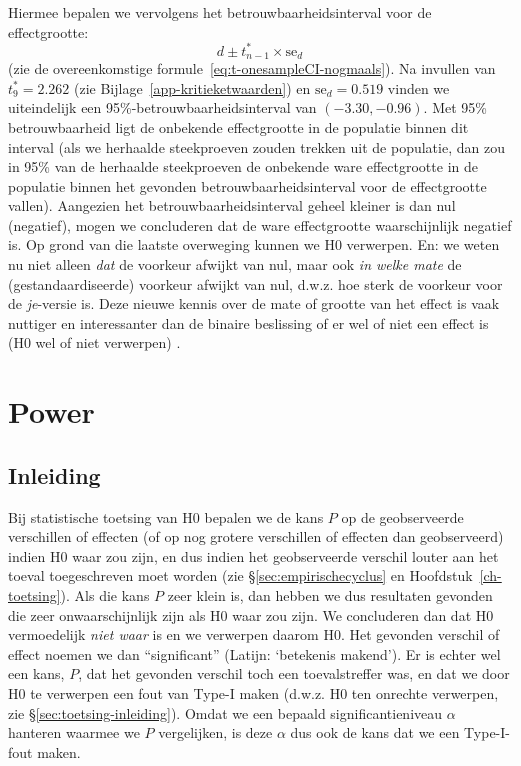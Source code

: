 \documentclass[
]{book}
\begin{document}
Hiermee bepalen we vervolgens het betrouwbaarheidsinterval voor de effectgrootte:
\begin{equation}
   \label{eq:d-paired-CI}
    d \pm t^*_{n-1} \times \textrm{se}_d 
\end{equation}
(zie de overeenkomstige formule~\eqref{eq:t-onesampleCI-nogmaals}).
Na invullen van \(t^*_9=2.262\) (zie Bijlage~\ref{app-kritieketwaarden})
en \(\textrm{se}_d = 0.519\) vinden we uiteindelijk een
95\%-betrouwbaarheidsinterval van \((-3.30,-0.96)\). Met 95\%
betrouwbaarheid ligt de onbekende effectgrootte in de populatie binnen
dit interval (als we herhaalde steekproeven zouden trekken uit de
populatie, dan zou in 95\% van de herhaalde steekproeven de onbekende ware effectgrootte in de populatie binnen het gevonden betrouwbaarheidsinterval voor de effectgrootte vallen). Aangezien het
betrouwbaarheidsinterval geheel kleiner is dan nul (negatief), mogen we
concluderen dat de ware effectgrootte waarschijnlijk negatief is. Op
grond van die laatste overweging kunnen we H0 verwerpen. En: we weten nu
niet alleen \emph{dat} de voorkeur afwijkt van nul, maar ook \emph{in welke mate}
de (gestandaardiseerde) voorkeur afwijkt van nul, d.w.z. hoe sterk de
voorkeur voor de \emph{je}-versie is. Deze nieuwe kennis over de mate of
grootte van het effect is vaak nuttiger en interessanter dan de binaire
beslissing of er wel of niet een effect is (H0 wel of niet verwerpen)
\citep{Cumm12}.

\chapter{Power}\label{ch-power}

\section{Inleiding}\label{sec:power-inleiding}

Bij statistische toetsing van H0 bepalen we de kans \(P\) op de
geobserveerde verschillen of effecten (of op nog grotere verschillen of
effecten dan geobserveerd) indien H0 waar zou zijn, en dus indien het
geobserveerde verschil louter aan het toeval toegeschreven moet worden
(zie §\ref{sec:empirischecyclus} en
Hoofdstuk~\ref{ch-toetsing}). Als die kans \(P\) zeer klein is, dan hebben we
dus resultaten gevonden die zeer onwaarschijnlijk zijn als H0 waar zou
zijn. We concluderen dan dat H0 vermoedelijk \emph{niet waar} is en we
verwerpen daarom H0. Het gevonden verschil of effect noemen we dan
``significant'' (Latijn: `betekenis makend'). Er is echter wel een kans,
\(P\), dat het gevonden verschil toch een toevalstreffer was, en dat we
door H0 te verwerpen een fout van Type-I maken (d.w.z. H0 ten onrechte
verwerpen, zie
§\ref{sec:toetsing-inleiding}). Omdat we een bepaald
significantieniveau \(\alpha\) hanteren waarmee we \(P\) vergelijken, is
deze \(\alpha\) dus ook de kans dat we een Type-I-fout maken.
\end{document}
